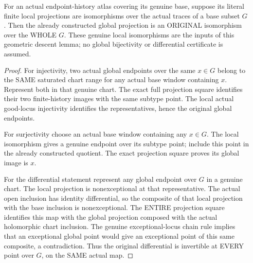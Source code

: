 \begin{theorem}
\label{hir:sharp-actual-global-projection-isomorphism-descent}
\leanok
For an actual endpoint-history atlas covering its genuine base, suppose
its literal finite local projections are isomorphisms over the actual
traces of a base subset $G$. Then the already constructed global
projection is an ORIGINAL isomorphism over the WHOLE $G$. These genuine
local isomorphisms are the inputs of this geometric descent lemma;
no global bijectivity or differential certificate is assumed.
\end{theorem}
\begin{proof}
For injectivity, two actual global endpoints over the same $x\in G$
belong to the SAME saturated chart range for any actual base window
containing $x$. Represent both in that genuine chart. The exact full
projection square identifies their two finite-history images with the
same subtype point. The local actual good-locus injectivity identifies
the representatives, hence the original global endpoints.

For surjectivity choose an actual base window containing any $x\in G$.
The local isomorphism gives a genuine endpoint over its subtype point;
include this point in the already constructed quotient. The exact
projection square proves its global image is $x$.

For the differential statement represent any global endpoint over $G$
in a genuine chart. The local projection is nonexceptional at that
representative. The actual open inclusion has identity differential,
so the composite of that local projection with the base inclusion is
nonexceptional. The ENTIRE projection square identifies this map with
the global projection composed with the actual holomorphic chart
inclusion. The genuine exceptional-locus chain rule implies that an
exceptional global point would give an exceptional point of this same
composite, a contradiction. Thus the original differential is
invertible at EVERY point over $G$, on the SAME actual map.
\end{proof}

